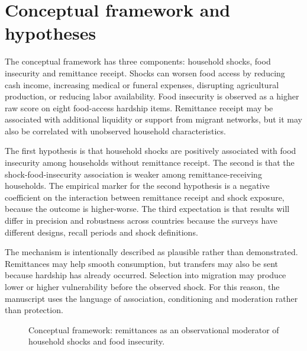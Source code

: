 \documentclass[11pt]{article}
\begin{document}
\section{Conceptual framework and hypotheses}

The conceptual framework has three components: household shocks, food insecurity and remittance receipt. Shocks can worsen food access by reducing cash income, increasing medical or funeral expenses, disrupting agricultural production, or reducing labor availability. Food insecurity is observed as a higher raw score on eight food-access hardship items. Remittance receipt may be associated with additional liquidity or support from migrant networks, but it may also be correlated with unobserved household characteristics.

The first hypothesis is that household shocks are positively associated with food insecurity among households without remittance receipt. The second is that the shock-food-insecurity association is weaker among remittance-receiving households. The empirical marker for the second hypothesis is a negative coefficient on the interaction between remittance receipt and shock exposure, because the outcome is higher-worse. The third expectation is that results will differ in precision and robustness across countries because the surveys have different designs, recall periods and shock definitions.

The mechanism is intentionally described as plausible rather than demonstrated. Remittances may help smooth consumption, but transfers may also be sent because hardship has already occurred. Selection into migration may produce lower or higher vulnerability before the observed shock. For this reason, the manuscript uses the language of association, conditioning and moderation rather than protection.

\begin{figure}[!htbp]
\centering
{}
\caption{Conceptual framework: remittances as an observational moderator of household shocks and food insecurity.}
\label{fig:conceptual}
\end{figure}
\end{document}
